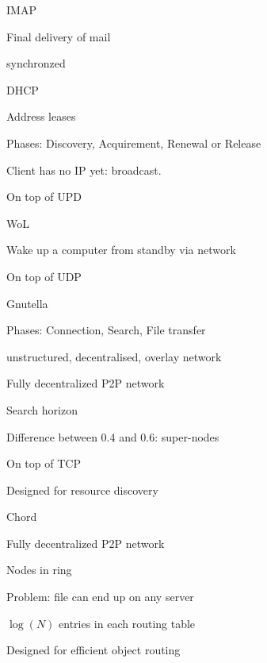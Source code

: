 \documentclass[main.tex]{subfiles}
\begin{document}
\begin{card}{IMAP}
\item Final delivery of mail
\item synchronzed
\end{card}


\begin{card}{DHCP}
\item Address leases
\item Phases: Discovery, Acquirement, Renewal or Release
\item Client has no IP yet: broadcast.
\item On top of UPD
\end{card}




\begin{card}{WoL}
\item Wake up a computer from standby via network
\item On top of UDP
\end{card}




\full{ }
\begin{card}{Gnutella}
\item Phases: Connection, Search, File transfer
\item unstructured, decentralised, overlay network
\item Fully decentralized P2P network
\item Search horizon
\item Difference between 0.4 and 0.6: super-nodes
\item On top of TCP
\item Designed for resource discovery
\end{card}


\begin{card}{Chord}
\item Fully decentralized P2P network
\item Nodes in ring
\item Problem: file can end up on any server
\item $\log(N)$ entries in each routing table
\item Designed for efficient object routing
\end{card}
\end{document}
